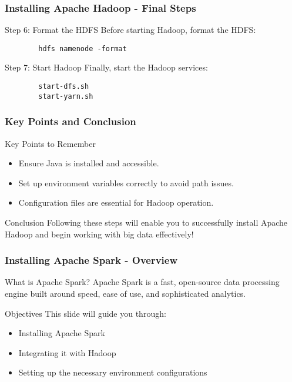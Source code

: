 \documentclass{beamer}
\begin{document}
\begin{frame}[fragile]
    \frametitle{Installing Apache Hadoop - Final Steps}
    \begin{block}{Step 6: Format the HDFS}
        Before starting Hadoop, format the HDFS:
        \begin{lstlisting}
        hdfs namenode -format
        \end{lstlisting}
    \end{block}

    \begin{block}{Step 7: Start Hadoop}
        Finally, start the Hadoop services:
        \begin{lstlisting}
        start-dfs.sh
        start-yarn.sh
        \end{lstlisting}
    \end{block}
\end{frame}

\begin{frame}
    \frametitle{Key Points and Conclusion}
    \begin{block}{Key Points to Remember}
        \begin{itemize}
            \item Ensure Java is installed and accessible.
            \item Set up environment variables correctly to avoid path issues.
            \item Configuration files are essential for Hadoop operation.
        \end{itemize}
    \end{block}
    
    \begin{block}{Conclusion}
        Following these steps will enable you to successfully install Apache Hadoop and begin working with big data effectively!
    \end{block}
\end{frame}

\begin{frame}[fragile]
    \frametitle{Installing Apache Spark - Overview}
    \begin{block}{What is Apache Spark?}
        Apache Spark is a fast, open-source data processing engine built around speed, ease of use, and sophisticated analytics.
    \end{block}
    \begin{block}{Objectives}
        This slide will guide you through:
        \begin{itemize}
            \item Installing Apache Spark
            \item Integrating it with Hadoop
            \item Setting up the necessary environment configurations
        \end{itemize}
    \end{block}
\end{frame}
\end{document}
